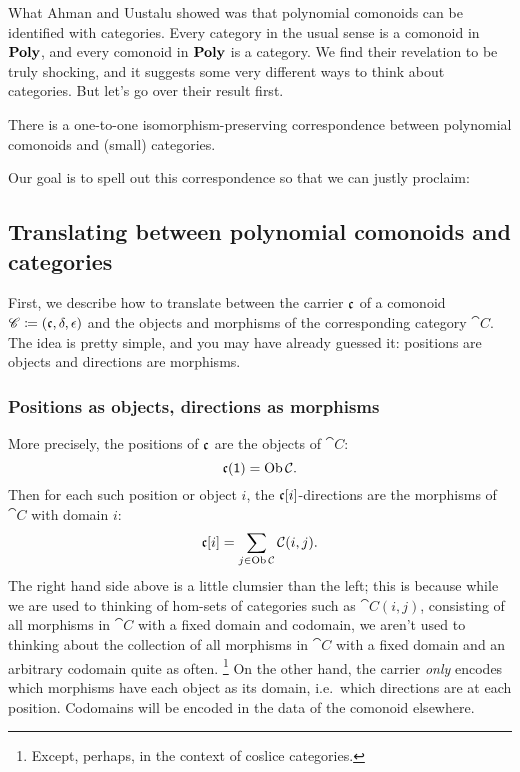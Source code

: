 \documentclass[Book-Poly]{subfiles}
\begin{document}
What Ahman and Uustalu showed was that polynomial comonoids can be identified with categories.
Every category in the usual sense is a comonoid in $\mathbf{Poly}$, and every comonoid in $\mathbf{Poly}$ is a category. 
We find their revelation to be truly shocking, and it suggests some very different ways to think about categories.
But let's go over their result first.

\begin{theorem}\label{thm.ahman_uustalu}
There is a one-to-one isomorphism-preserving correspondence between polynomial comonoids and (small) categories.
\end{theorem}

Our goal is to spell out this correspondence so that we can justly proclaim:


\subsection{Translating between polynomial comonoids and categories}

First, we describe how to translate between the carrier $\mathfrak{c}$ of a comonoid $\mathscr{C}\coloneqq(\mathfrak{c},\delta,\epsilon)$ and the objects and morphisms of the corresponding category $\cat{C}$.
The idea is pretty simple, and you may have already guessed it: positions are objects and directions are morphisms.

\subsubsection{Positions as objects, directions as morphisms}

More precisely, the positions of $\mathfrak{c}$ are the objects of $\cat{C}$:
\begin{equation} \label{eqn.pos_obj}
    \mathfrak{c}(\textsf{1})=\operatorname{Ob}\mathcal{C}.
\end{equation}
Then for each such position or object $i$, the $\mathfrak{c}[i]$-directions are the morphisms of $\cat{C}$ with domain $i$:
\begin{equation} \label{eqn.dir_mor}
    \mathfrak{c}[i]=\sum_{j\in\operatorname{Ob}\mathcal{C}}\mathcal{C}(i,j).
\end{equation}
The right hand side above is a little clumsier than the left; this is because while we are used to thinking of hom-sets of categories such as $\cat{C}(i,j)$, consisting of all morphisms in $\cat{C}$ with a fixed domain and codomain, we aren't used to thinking about the collection of all morphisms in $\cat{C}$ with a fixed domain and an arbitrary codomain quite as often.%
\footnote{Except, perhaps, in the context of coslice categories.}
On the other hand, the carrier \emph{only} encodes which morphisms have each object as its domain, i.e.\ which directions are at each position.
Codomains will be encoded in the data of the comonoid elsewhere.
\end{document}
